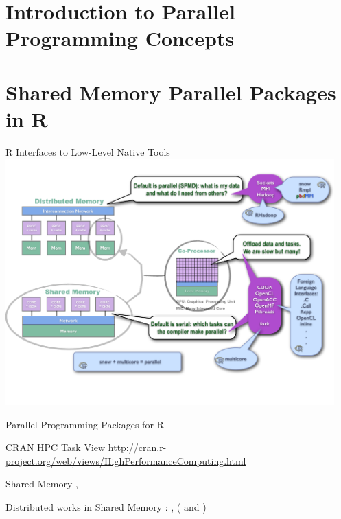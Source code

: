 \section{Introduction to Parallel Programming Concepts}
\makesubcontentsslides



\section{Shared Memory Parallel Packages in R}
\makesubcontentsslides

\begin{frame}{R Interfaces to Low-Level Native Tools}
\includegraphics[width=0.95\textwidth]
{../common/pics/hardware/ParallelHardware10.pdf}
\end{frame}


\begin{frame}{Parallel Programming Packages for R}
  \begin{block}{CRAN HPC Task View}\small
    \url{http://cran.r-project.org/web/views/HighPerformanceComputing.html}
  \end{block}
  \begin{center}
    \begin{block}{Shared Memory}
      , 
    \end{block}
    \begin{block}{Distributed works in Shared Memory}
      \pbdR: ,  ( and
      )
    \end{block}
  \end{center}
\end{frame}


